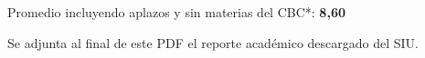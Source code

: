 Promedio incluyendo aplazos y sin materias del CBC*: \textbf{8,60}

Se adjunta al final de este PDF el reporte académico descargado del SIU.
